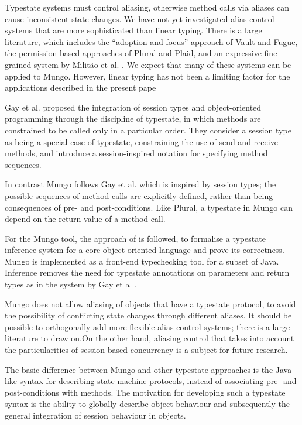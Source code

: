 Typestate systems must control aliasing, otherwise method calls via
aliases can cause inconsistent state changes. We have not yet
investigated alias control systems that are more sophisticated than
linear typing. There is a large literature, which includes the
``adoption and focus'' approach of Vault and Fugue, the permission-based
approaches of Plural and Plaid, and an expressive fine-grained system by
Milit\~ao {et al.} \cite{MilitaoFetal:aliasing-control}. We expect that
many of these systems can be applied to Mungo. However, linear typing
has not been a limiting factor for the applications described in the
present pape


Gay et al. \cite{gay.vasconcelos.etal_modular-session-types} proposed the integration of session types and object-oriented programming through the discipline of typestate\cite{typestates}, in which methods are constrained to be called only in a particular order.
They consider a session type as being a special case of typestate, constraining the use of send and receive methods, and introduce a session-inspired notation for specifying method sequences. 

In contrast Mungo follows Gay et al. which is inspired by session types; the possible sequences of method calls are explicitly defined, rather than being consequences of pre- and post-conditions. Like Plural, a typestate in Mungo can depend on the return value of a method call.

For the Mungo tool\cite{mungo}, the approach of \cite{gay.vasconcelos.etal_modular-session-types} is followed, to formalise a typestate inference system for a core object-oriented language and prove its correctness. Mungo is implemented as a front-end typechecking tool for a subset of Java. Inference removes the need for typestate annotations on parameters and return types as in the system by Gay et al \cite{gay.vasconcelos.etal_modular-session-types}.


Mungo does not allow aliasing of objects that have a typestate protocol, to avoid the possibility of conflicting state changes through different aliases. It should be possible to orthogonally add more flexible alias control systems; there is a large literature to draw on.On the other hand, aliasing control that takes into account the particularities of session-based concurrency is a subject for future research.


 The basic difference between Mungo and other typestate approaches is the Java-like syntax for describing state machine protocols, instead of associating pre- and post-conditions with methods. The motivation for developing such a typestate syntax is the ability to globally describe object behaviour and subsequently the general integration of session behaviour in objects.




